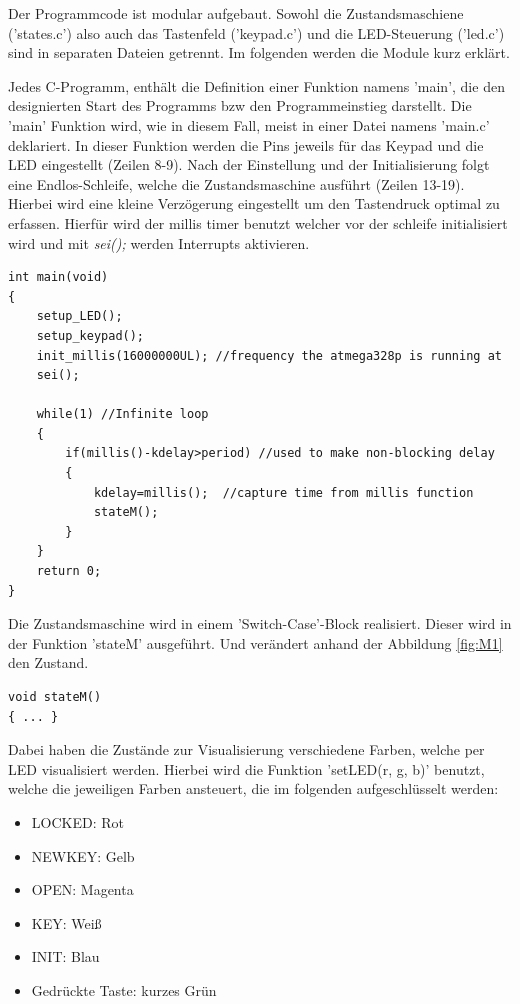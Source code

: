 Der Programmcode ist modular aufgebaut. Sowohl die Zustandsmaschiene ('states.c') also auch das Tastenfeld ('keypad.c') und die LED-Steuerung ('led.c') sind in separaten Dateien getrennt. Im folgenden werden die Module kurz erklärt.

Jedes C-Programm, enthält die Definition einer Funktion namens 'main', die den designierten Start des Programms bzw den Programmeinstieg darstellt. Die 'main' Funktion wird, wie in diesem Fall, meist in einer Datei namens 'main.c' deklariert. In dieser Funktion werden die Pins jeweils für das Keypad und die LED eingestellt (Zeilen 8-9). Nach der Einstellung und der Initialisierung folgt eine Endlos-Schleife, welche die Zustandsmaschine ausführt (Zeilen 13-19). Hierbei wird eine kleine Verzögerung eingestellt um den Tastendruck optimal zu erfassen. Hierfür wird der millis timer benutzt welcher vor der schleife initialisiert wird und mit \textit{sei();} werden Interrupts aktivieren. 

\begin{lstlisting}[style=CStyle-numbers]
int main(void)
{
    setup_LED();
    setup_keypad();
    init_millis(16000000UL); //frequency the atmega328p is running at
    sei();
	
    while(1) //Infinite loop
    {
        if(millis()-kdelay>period) //used to make non-blocking delay
        {
            kdelay=millis();  //capture time from millis function
            stateM();
        }
    }
    return 0;
}
\end{lstlisting}

Die Zustandsmaschine wird in einem 'Switch-Case'-Block realisiert. Dieser wird in der Funktion 'stateM' ausgeführt. Und verändert anhand der Abbildung \ref{fig:M1} den Zustand. 
\begin{lstlisting}[style=CStyle]
void stateM()
{ ... }
\end{lstlisting}

Dabei haben die Zustände zur Visualisierung verschiedene Farben, welche per LED visualisiert werden. Hierbei wird die Funktion 'setLED(r, g, b)' benutzt, welche die jeweiligen Farben ansteuert, die im folgenden aufgeschlüsselt werden: 

\begin{itemize}
\label{state-colors}
    \item LOCKED: Rot
    \item NEWKEY: Gelb
    \item OPEN: Magenta
    \item KEY: Weiß
    \item INIT: Blau
    \item Gedrückte Taste: kurzes Grün
\end{itemize}

